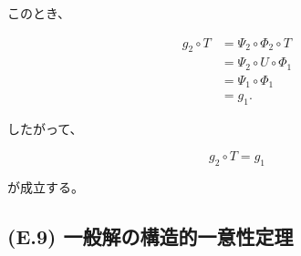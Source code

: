 \documentclass[a4paper,11pt]{article}
\begin{document}
このとき、

\begin{align}
    g_2\circ T
    &=
    \Psi_2\circ\Phi_2\circ T
    \\
    &=
    \Psi_2\circ U\circ\Phi_1
    \\
    &=
    \Psi_1\circ\Phi_1
    \\
    &=
    g_1.
\end{align}

したがって、

\begin{equation}
    \boxed{
        g_2\circ T
        =
        g_1
    }
    \label{eq:E-final-evaluation-invariance}
\end{equation}

が成立する。


\subsection{(E.9) 一般解の構造的一意性定理}
\label{subsec:E9}
\end{document}
